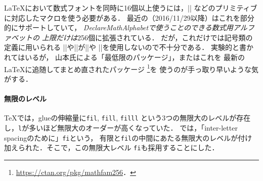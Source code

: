 \documentclass[a4paper,11pt,nomag,dvipdfmx]{jsarticle}
\begin{document}
\medskip
\LaTeX において数式フォントを同時に16個以上使うには，|\omathchar|%
などのプリミティブに対応したマクロを使う必要がある．
最近の\pLaTeX（2016/11/29以降）はこれを部分的にサポートしていて，
\emph{\.{DeclareMathAlphabet}で使うことのできる数式用アルファベットの
上限だけは}256個に拡張されている．
だが，これだけでは記号類の定義に用いられる
|\DeclareMathSymbol|や|\DeclareMathDelimiter|が|\omathchar|や
|\odelcode|を使用しないので不十分である．
実験的と書かれてはいるが，
山本氏による「最低限のパッケージ」\cite{yamamoto3}，またはこれを
最新の\LaTeX に追随してまとめ直されたパッケージ
\footnote{\url{https://ctan.org/pkg/mathfam256}．}を
使うのが手っ取り早いような気がする．

\paragraph{無限のレベル}
\TeX では，glueの伸縮量に\texttt{fil}, \texttt{fill}, \texttt{filll}
という3つの無限大のレベルが存在し，\texttt{l}が多いほど無限大のオーダーが高くなっていた．
\OMEGA では，「inter-letter spacingのために」\texttt{fi}という，
有限と\texttt{fil}の中間にあたる無限大のレベルが付け加えられた．そこで，この無限大レベル
\texttt{fi}も採用することにした．

\medskip
\end{document}
